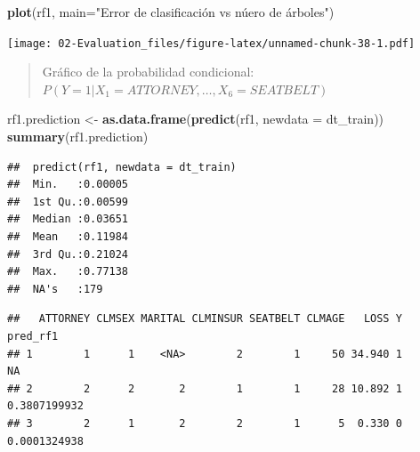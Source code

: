 \documentclass[]{book}
\newenvironment{Shaded}{\begin{snugshade}}{\end{snugshade}}
\newcommand{\DataTypeTok}[1]{\textcolor[rgb]{0.13,0.29,0.53}{#1}}
\newcommand{\DecValTok}[1]{\textcolor[rgb]{0.00,0.00,0.81}{#1}}
\newcommand{\KeywordTok}[1]{\textcolor[rgb]{0.13,0.29,0.53}{\textbf{#1}}}
\newcommand{\NormalTok}[1]{#1}
\newcommand{\OperatorTok}[1]{\textcolor[rgb]{0.81,0.36,0.00}{\textbf{#1}}}
\newcommand{\StringTok}[1]{\textcolor[rgb]{0.31,0.60,0.02}{#1}}
\begin{document}
\begin{Shaded}
\begin{Highlighting}[]
  \KeywordTok{plot}\NormalTok{(rf1, }\DataTypeTok{main=}\StringTok{"Error de clasificación vs núero de  árboles"}\NormalTok{) }
\end{Highlighting}
\end{Shaded}

\texttt{[image: 02-Evaluation\_files/figure-latex/unnamed-chunk-38-1.pdf]}

\begin{quote}
Gráfico de la probabilidad condicional: \(P(Y=1|X_1 = ATTORNEY,\ldots,X_6=SEATBELT)\)
\end{quote}

\begin{Shaded}
\begin{Highlighting}[]
\NormalTok{  rf1.prediction <-}\StringTok{ }\KeywordTok{as.data.frame}\NormalTok{(}\KeywordTok{predict}\NormalTok{(rf1, }\DataTypeTok{newdata =}\NormalTok{ dt_train))}
  \KeywordTok{summary}\NormalTok{(rf1.prediction)}
\end{Highlighting}
\end{Shaded}

\begin{verbatim}
##  predict(rf1, newdata = dt_train)
##  Min.   :0.00005                 
##  1st Qu.:0.00599                 
##  Median :0.03651                 
##  Mean   :0.11984                 
##  3rd Qu.:0.21024                 
##  Max.   :0.77138                 
##  NA's   :179
\end{verbatim}

\begin{Shaded}
\end{Shaded}

\begin{verbatim}
##   ATTORNEY CLMSEX MARITAL CLMINSUR SEATBELT CLMAGE   LOSS Y     pred_rf1
## 1        1      1    <NA>        2        1     50 34.940 1           NA
## 2        2      2       2        1        1     28 10.892 1 0.3807199932
## 3        2      1       2        2        1      5  0.330 0 0.0001324938
\end{verbatim}
\end{document}
